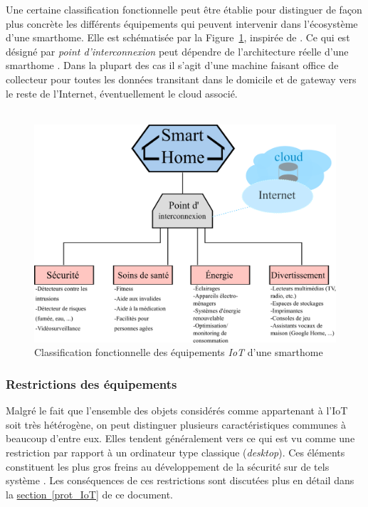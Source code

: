 \documentclass[]{article}
\newcommand{\wordlink}[2]{\hyperref[#1]{#2~\ref{#1}}}
\begin{document}
\par Une certaine classification fonctionnelle peut être établie pour distinguer de façon plus concrète les différents équipements qui peuvent intervenir dans l'écosystème d'une smarthome. Elle est schématisée par la Figure~\ref{sm_class}, inspirée de \cite{Basman2016}. Ce qui est désigné par \textit{point d'interconnexion} peut dépendre de l'architecture réelle d'une smarthome \cite{Huichen2016}. Dans la plupart des cas il s'agit d'une machine faisant office de collecteur pour toutes les données transitant dans le domicile et de gateway vers le reste de l'Internet, éventuellement le cloud associé.\\

~\\

\begin{figure}[!h]
\centering
\includegraphics[scale=1.4]{smarthome_class.png}
\caption{Classification fonctionnelle des équipements \textit{IoT} d'une smarthome}
\label{sm_class}
\end{figure}

\newpage


\subsubsection{Restrictions des équipements}\label{restr_IoT}

Malgré le fait que l'ensemble des objets considérés comme appartenant à l'IoT soit très hétérogène, on peut distinguer plusieurs caractéristiques communes à beaucoup d'entre eux. Elles tendent généralement vers ce qui est vu comme une restriction par rapport à un ordinateur type classique (\textit{desktop}). Ces éléments constituent les plus gros freins au développement de la sécurité sur de tels système \cite{Wind2015}. Les conséquences de ces restrictions sont discutées plus en détail dans la \wordlink{prot_IoT}{section} de ce document.\\
\end{document}
